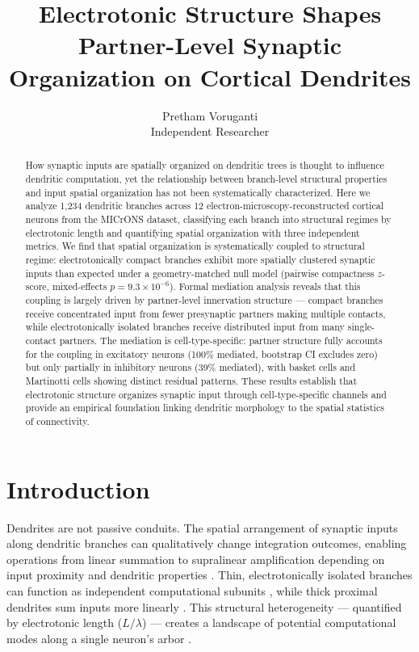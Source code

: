 \documentclass[11pt]{article}
\title{Electrotonic Structure Shapes Partner-Level Synaptic Organization on Cortical Dendrites}
\author{
Pretham Voruganti\\
\small Independent Researcher
}
\date{}
\begin{document}
\maketitle

\begin{abstract}
How synaptic inputs are spatially organized on dendritic trees is thought to influence dendritic computation, yet the relationship between branch-level structural properties and input spatial organization has not been systematically characterized. Here we analyze 1,234 dendritic branches across 12 electron-microscopy-reconstructed cortical neurons from the MICrONS dataset, classifying each branch into structural regimes by electrotonic length and quantifying spatial organization with three independent metrics. We find that spatial organization is systematically coupled to structural regime: electrotonically compact branches exhibit more spatially clustered synaptic inputs than expected under a geometry-matched null model (pairwise compactness $z$-score, mixed-effects $p = 9.3 \times 10^{-6}$). Formal mediation analysis reveals that this coupling is largely driven by partner-level innervation structure --- compact branches receive concentrated input from fewer presynaptic partners making multiple contacts, while electrotonically isolated branches receive distributed input from many single-contact partners. The mediation is cell-type-specific: partner structure fully accounts for the coupling in excitatory neurons (100\% mediated, bootstrap CI excludes zero) but only partially in inhibitory neurons (39\% mediated), with basket cells and Martinotti cells showing distinct residual patterns. These results establish that electrotonic structure organizes synaptic input through cell-type-specific channels and provide an empirical foundation linking dendritic morphology to the spatial statistics of connectivity.
\end{abstract}

\section{Introduction}

Dendrites are not passive conduits. The spatial arrangement of synaptic inputs along dendritic branches can qualitatively change integration outcomes, enabling operations from linear summation to supralinear amplification depending on input proximity and dendritic properties \citep{london2005, mel1994}. Thin, electrotonically isolated branches can function as independent computational subunits \citep{polsky2004, poirazi2003}, while thick proximal dendrites sum inputs more linearly \citep{rall1967}. This structural heterogeneity --- quantified by electrotonic length ($L/\lambda$) --- creates a landscape of potential computational modes along a single neuron's arbor \citep{koch1999}.
\end{document}
